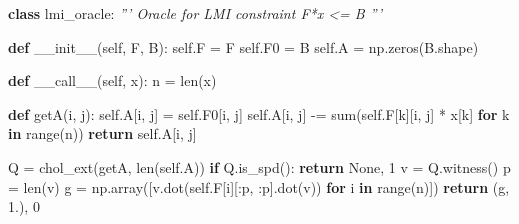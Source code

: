 \documentclass[10pt,ignorenonframetext,serif,onlymath]{beamer}
\newenvironment{Shaded}{}{}
\newcommand{\BuiltInTok}[1]{#1}
\newcommand{\CommentTok}[1]{\textcolor[rgb]{0.38,0.63,0.69}{\textit{#1}}}
\newcommand{\ControlFlowTok}[1]{\textcolor[rgb]{0.00,0.44,0.13}{\textbf{#1}}}
\newcommand{\DecValTok}[1]{\textcolor[rgb]{0.25,0.63,0.44}{#1}}
\newcommand{\FloatTok}[1]{\textcolor[rgb]{0.25,0.63,0.44}{#1}}
\newcommand{\FunctionTok}[1]{\textcolor[rgb]{0.02,0.16,0.49}{#1}}
\newcommand{\KeywordTok}[1]{\textcolor[rgb]{0.00,0.44,0.13}{\textbf{#1}}}
\newcommand{\NormalTok}[1]{#1}
\newcommand{\OperatorTok}[1]{\textcolor[rgb]{0.40,0.40,0.40}{#1}}
\newcommand{\VariableTok}[1]{\textcolor[rgb]{0.10,0.09,0.49}{#1}}
\begin{document}
\begin{frame}[fragile]

\begin{Shaded}
\begin{Highlighting}[]
\KeywordTok{class}\NormalTok{ lmi_oracle:}
    \CommentTok{''' Oracle for LMI constraint F*x <= B '''}

    \KeywordTok{def} \FunctionTok{__init__}\NormalTok{(}\VariableTok{self}\NormalTok{, F, B):}
        \VariableTok{self}\NormalTok{.F }\OperatorTok{=}\NormalTok{ F}
        \VariableTok{self}\NormalTok{.F0 }\OperatorTok{=}\NormalTok{ B}
        \VariableTok{self}\NormalTok{.A }\OperatorTok{=}\NormalTok{ np.zeros(B.shape)}

    \KeywordTok{def} \FunctionTok{__call__}\NormalTok{(}\VariableTok{self}\NormalTok{, x):}
\NormalTok{        n }\OperatorTok{=} \BuiltInTok{len}\NormalTok{(x)}

        \KeywordTok{def}\NormalTok{ getA(i, j):}
            \VariableTok{self}\NormalTok{.A[i, j] }\OperatorTok{=} \VariableTok{self}\NormalTok{.F0[i, j]}
            \VariableTok{self}\NormalTok{.A[i, j] }\OperatorTok{-=} \BuiltInTok{sum}\NormalTok{(}\VariableTok{self}\NormalTok{.F[k][i, j] }\OperatorTok{*}\NormalTok{ x[k]}
                                \ControlFlowTok{for}\NormalTok{ k }\KeywordTok{in} \BuiltInTok{range}\NormalTok{(n))}
            \ControlFlowTok{return} \VariableTok{self}\NormalTok{.A[i, j]}

\NormalTok{        Q }\OperatorTok{=}\NormalTok{ chol_ext(getA, }\BuiltInTok{len}\NormalTok{(}\VariableTok{self}\NormalTok{.A))}
        \ControlFlowTok{if}\NormalTok{ Q.is_spd(): }\ControlFlowTok{return} \VariableTok{None}\NormalTok{, }\DecValTok{1}
\NormalTok{        v }\OperatorTok{=}\NormalTok{ Q.witness()}
\NormalTok{        p }\OperatorTok{=} \BuiltInTok{len}\NormalTok{(v)}
\NormalTok{        g }\OperatorTok{=}\NormalTok{ np.array([v.dot(}\VariableTok{self}\NormalTok{.F[i][:p, :p].dot(v))}
                      \ControlFlowTok{for}\NormalTok{ i }\KeywordTok{in} \BuiltInTok{range}\NormalTok{(n)])}
        \ControlFlowTok{return}\NormalTok{ (g, }\FloatTok{1.}\NormalTok{), }\DecValTok{0}
\end{Highlighting}
\end{Shaded}

\end{frame}
\end{document}
